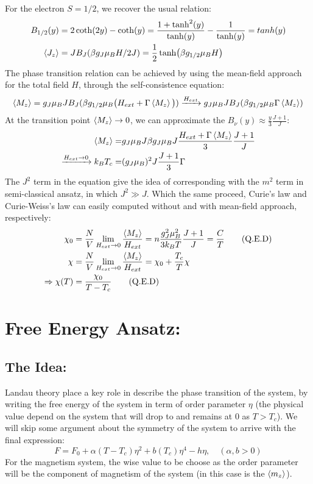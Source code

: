 \documentclass[a4paper]{article}
\begin{document}
For the electron \(S = 1/2\), we recover the usual relation:
\begin{align*}
	B_{1/2}(y) &= 2\coth(2y) - \coth(y) = \frac{1 + \tanh^2 (y) }{\tanh(y)} - \frac{1}{\tanh(y)} = tanh(y) \\
	\ev{J_z} &= J B_{J}(\beta g_J \mu_B H /2J) = \frac{1}{2} \tanh (\beta g_{1/2} \mu_B H)	
\end{align*}
The phase transition relation can be achieved by using the mean-field approach for the total field \(H\), through the self-consistence equation:
\begin{equation}
	\ev{M_z} = g_J \mu_B J B_{J}(\beta g_{1/2} \mu_B \big(H_{ext} + \Gamma \ev{M_z} \big)) \xrightarrow{H_{ext}} g_J \mu_B J B_{J}(\beta g_{1/2} \mu_B\Gamma \ev{M_z})
\end{equation}
At the transition point \(\ev{M_z} \to 0\), we can approximate the \(B_{\nu}(y) \approx \frac{y}{3} \frac{J + 1}{J}\):
\begin{align}
	\ev{M_z} =& g_J \mu_B J \beta g_{J} \mu_B J\frac{H_{ext} + \Gamma \ev{M_z}}{3} \frac{J + 1}{J}\nonumber\\
	\xrightarrow{H_{ext} \to 0}k_B T_c =&  (g_J \mu_B)^2 J\frac{J + 1}{3} \Gamma
\end{align}
\quad The \(J^2\) term in the equation give the idea of corresponding with the \(m^2\) term in semi-classical ansatz, in which \(J^2 \gg J\). Which the same proceed, Curie's law and Curie-Weiss's law can easily computed without and with mean-field approach, respectively:
\begin{align*}
	\chi_0 &= \frac{N}{V}\lim_{H_{ext} \to 0} \frac{\ev{M_z}}{H_{ext}} = n\frac{g_J^2 \mu_B^2 }{3k_B T} \frac{J+1}{J} = \frac{C}{T} \qquad \text{(Q.E.D)}\\
	\chi &= \frac{N}{V} \lim_{H_{ext} \to 0} \frac{\ev{M_z}}{H_{ext}} = \chi_0 + \frac{T_c}{T} \chi\\
	\Rightarrow \chi(T) &= \frac{\chi_0}{T - T_c} \qquad \text{(Q.E.D)}
\end{align*}
\section{Free Energy Ansatz:}
\subsection{The Idea:}
\quad Landau theory place a key role in describe the phase transition of the system, by writing the free energy of the system in term of order parameter \(\eta\) (the physical value depend on the system that will drop to and remains at 0 as \(T>T_c\)). We will skip some argument about the symmetry of the system to arrive with the final expression:
\begin{equation}
	F = F_0 + \alpha (T - T_c) \eta^2 + b(T_c) \eta^4 - h\eta, \quad (\alpha, b > 0)
\end{equation}
\quad For the magnetism system, the wise value to be choose as the order parameter will be the component of magnetism of the system (in this case is the \(\ev{m_z}\)).\\
\end{document}

